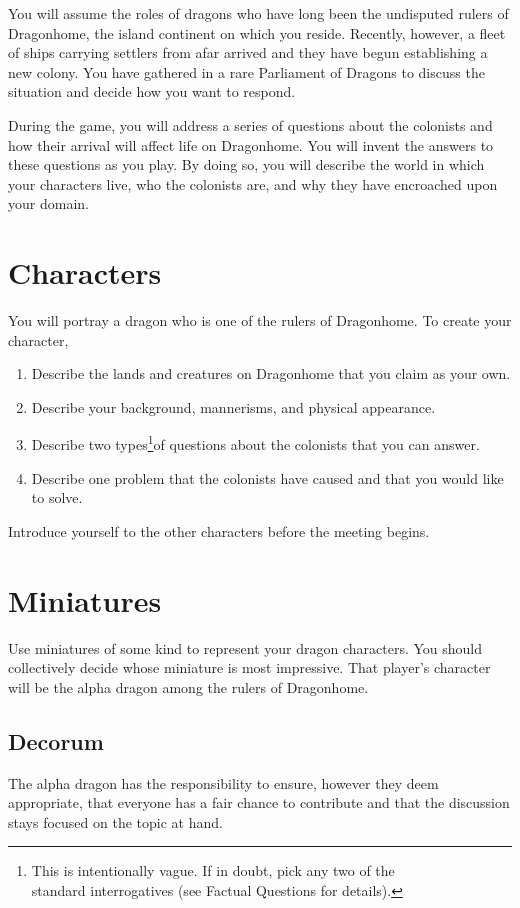 \documentclass[a6paper, 11pt, parskip=half, DIV=15]{scrartcl}
\begin{document}
You will assume the roles of dragons who have long been the undisputed rulers of Dragonhome, the island continent on which you reside. Recently, however, a fleet of ships carrying settlers from afar arrived and they have begun establishing a new colony. You have gathered in a rare Parliament of Dragons to discuss the situation and decide how you want to respond.

During the game, you will address a series of questions about the colonists and how their arrival will affect life on Dragonhome. You will invent the answers to these questions as you play. By doing so, you will describe the world in which your characters live, who the colonists are, and why they have encroached upon your domain.


\newpage
\enlargethispage{1.75\baselineskip}
\section*{Characters}
You will portray a dragon who is one of the rulers of Dragonhome. To create your character,
\begin{enumerate}[nosep]
	\item Describe the lands and creatures on Dragonhome that you claim as your own.
	\item Describe your background, mannerisms, and physical appearance.
	\item Describe two types\footnote[1]{This is intentionally vague. If in doubt, pick any two of the\\standard interrogatives (see {\setmainfont{Cinzel-Bold}\scriptsize Factual Questions} for details).}of questions about the colonists that you can answer.
	\item Describe one problem that the colonists have caused and that you would like to solve.
\end{enumerate}
Introduce yourself to the other characters before the meeting begins.

\section*{Miniatures}
Use miniatures of some kind to represent your dragon characters. You should collectively decide whose miniature is most impressive. That player's character will be the alpha dragon among the rulers of Dragonhome. 

\newpage
\enlargethispage{1.75\baselineskip}
\subsection*{Decorum}
The alpha dragon has the responsibility to ensure, however they deem appropriate, that everyone has a fair chance to contribute and that the discussion stays focused on the topic at hand. %
\end{document}
